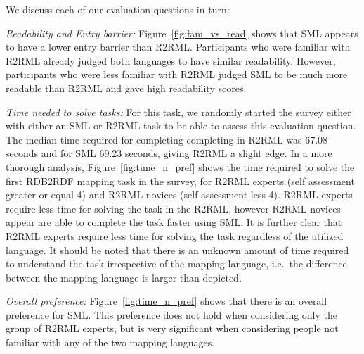 We discuss each of our evaluation questions in turn:

\emph{Readability and Entry barrier:} Figure~\ref{fig:fam_vs_read} shows that SML appears to have a lower entry barrier than R2RML.
Participants who were familiar with R2RML already judged both languages to have similar readability.
However, participants who were less familiar with R2RML judged SML to be much more readable than R2RML and gave high readability scores.

\emph{Time needed to solve tasks:}
For this task, we randomly started the survey either with either an SML or R2RML task to be able to assess this evaluation question.
The median time required for completing completing in R2RML was 67.08 seconds and for SML 69.23 seconds, giving R2RML a slight edge.
In a more thorough analysis, Figure~\ref{fig:time_n_pref} shows the time required to solve the first RDB2RDF mapping task in the survey, for R2RML experts (self assessment greater or equal 4) and R2RML novices (self assessment less 4).
R2RML experts require less time for solving the task in the R2RML, however R2RML novices appear are able to complete the task faster using SML.
It is further clear that R2RML experts require less time for solving the task regardless of the utilized language.
It should be noted that there is an unknown amount of time required to understand the task irrespective of the mapping language, i.e.~the difference between the mapping language is larger than depicted.


\emph{Overall preference:} Figure~\ref{fig:time_n_pref} shows that there is an overall preference for SML. This preference does not hold when considering only the group of R2RML experts, but is very significant when considering people not familiar with any of the two mapping languages.


